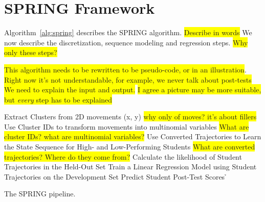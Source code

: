 \documentclass{sigchi}
\newcommand{\hl}[1]{\colorbox{yellow}{#1}}
\def\algname{SPRING\xspace}
\begin{document}
\section{SPRING Framework}
Algorithm~\ref{alg:spring} describes the SPRING algorithm.
\hl{Describe in words}
We now describe  the discretization, sequence modeling and regression steps.  
\hl{Why only these steps?}

\hl{This algorithm needs to be rewritten to be pseudo-code, or in an illustration}.
\hl{ Right now it's not understandable, for example, we never talk about post-tests}
\hl{We need to explain the input and output.}
\hl{I agree a  picture may be more suitable, but \textit{every} step has to be explained}

\begin{algorithm}
\begin{algorithmic}
\State Extract Clusters from 2D movements (x, y) \hl{why only of moves? it's about fillers}
\State Use Cluster IDs to transform movements into multinomial variables  \hl{What are cluster IDs? what are multinomial variables?}
\State Use Converted Trajectories to Learn the State Sequence for High- and Low-Performing Students \hl{What are converted trajectories? Where do they come from?}
\State Calculate the likelihood of Student Trajectories in the Held-Out Set 
\State Train a Linear Regression Model using Student Trajectories on the Development Set
\State Predict Student Post-Test Scores \h
\end{algorithmic}
\caption{The \algname pipeline. \label{alg:spring}}
\end{algorithm}
\end{document}
